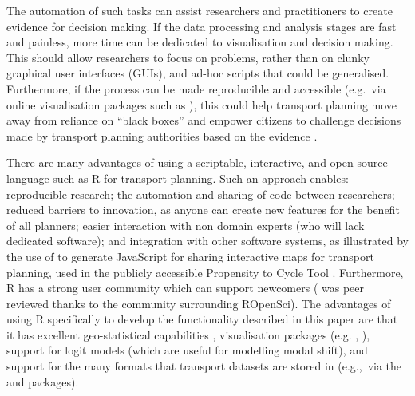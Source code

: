 The automation of such tasks can assist researchers and practitioners to
create evidence for decision making. If the data processing and analysis
stages are fast and painless, more time can be dedicated to
visualisation and decision making. This should allow researchers to
focus on problems, rather than on
clunky graphical user interfaces (GUIs), and ad-hoc scripts that could
be generalised. Furthermore, if the process can be made reproducible and
accessible (e.g.~via online visualisation packages such as
), this could help transport
planning move away from reliance on ``black boxes''
\citep{waddell_urbansim:_2002} and empower citizens to
challenge decisions made by transport planning authorities based on the evidence \citep{hollander_transport_2016}.

There are many advantages of using a scriptable, interactive, and open source
language such as R for transport planning.
Such an approach enables:
reproducible research; the automation and sharing of
code between researchers;
reduced barriers to innovation, as anyone can create new features for the benefit of all planners;
easier interaction with non domain experts (who will lack dedicated software);
and integration with other
software systems, as illustrated by the use of 
to generate JavaScript for sharing interactive maps for transport planning,
used in the publicly accessible Propensity to Cycle Tool \citep{lovelace_propensity_2017}.
Furthermore, R has a strong user community which can support newcomers
( was peer reviewed thanks to the community surrounding ROpenSci).
The advantages of using R specifically to develop the
functionality described in this paper are that it has excellent
geo-statistical capabilities \citep{pebesma_software_2015},
visualisation packages (e.g. , ),
support for logit models (which are useful for modelling modal shift),
and support for the many formats that transport datasets are stored in (e.g.,~via the
 and  packages).

